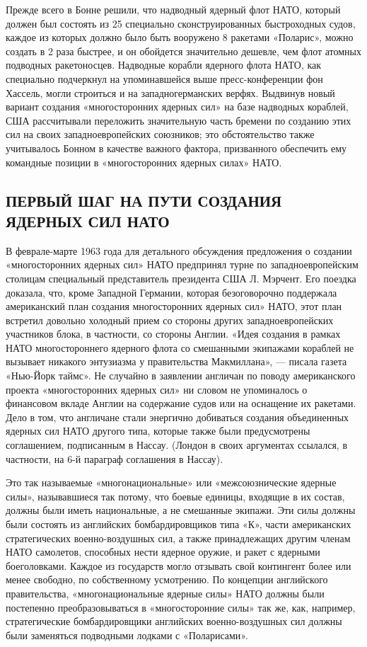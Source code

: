 \documentclass[12pt, a4paper, openany]{book}
\begin{document}
Прежде всего в Бонне решили, что надводный ядерный флот НАТО, который должен был состоять из 25 специально сконструированных быстроходных судов, каждое из которых должно было быть вооружено 8 ракетами «Поларис», можно создать в 2 раза быстрее, и он обойдется значительно дешевле, чем флот атомных подводных ракетоносцев. Надводные корабли ядерного флота НАТО, как специально подчеркнул на упоминавшейся выше пресс-конференции фон Хассель, могли строиться и на западногерманских верфях. Выдвинув новый вариант создания «многосторонних ядерных сил» на базе надводных кораблей, США рассчитывали переложить значительную часть бремени по созданию этих сил на своих западноевропейских союзников; это обстоятельство также учитывалось Бонном в качестве важного фактора, призванного обеспечить ему командные позиции в «многосторонних ядерных силах» НАТО.

	\subsection[Первый шаг на пути создания ядерных сил НАТО]{\center ПЕРВЫЙ ШАГ НА ПУТИ СОЗДАНИЯ ЯДЕРНЫХ СИЛ НАТО}


В феврале-марте 1963 года для детального обсуждения предложения о создании «многосторонних ядерных сил» НАТО предпринял турне по западноевропейским столицам специальный представитель президента США Л. Мэрчент. Его поездка доказала, что, кроме Западной Германии, которая безоговорочно поддержала американский план создания многосторонних ядерных сил» НАТО, этот план встретил довольно холодный прием со стороны других западноевропейских участников блока, в частности, со стороны Англии. «Идея создания в рамках НАТО многостороннего ядерного флота со смешанными экипажами кораблей не вызывает никакого энтузиазма у правительства Макмиллана», — писала газета «Нью-Йорк таймс». Не случайно в заявлении англичан по поводу американского проекта «многосторонних ядерных сил» ни словом не упоминалось о финансовом вкладе Англии на содержание судов или на оснащение их ракетами. Дело в том, что англичане стали энергично добиваться создания объединенных ядерных сил НАТО другого типа, которые также были предусмотрены соглашением, подписанным в Нассау. (Лондон в своих аргументах ссылался, в частности, на 6-й параграф соглашения в Нассау).


Это так называемые «многонациональные» или «межсоюзнические ядерные силы», называвшиеся так потому, что боевые единицы, входящие в их состав, должны были иметь национальные, а не смешанные экипажи. Эти силы должны были состоять из английских бомбардировщиков типа «К», части американских стратегических военно-воздушных сил, а также принадлежащих другим членам НАТО самолетов, способных нести ядерное оружие, и ракет с ядерными боеголовками. Каждое из государств могло отзывать свой контингент более или менее свободно, по собственному усмотрению. По концепции английского правительства, «многонациональные ядерные силы» НАТО должны были постепенно преобразовываться в «многосторонние силы» так же, как, например, стратегические бомбардировщики английских военно-воздушных сил должны были заменяться подводными лодками с «Поларисами».
\end{document}
